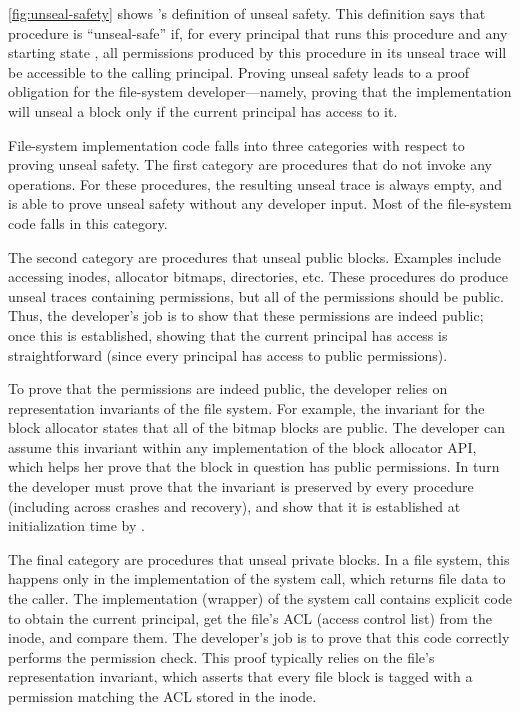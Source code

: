 \autoref{fig:unseal-safety} shows \sys's definition of unseal safety.
This definition says that procedure  is ``unseal-safe'' if,
for every principal  that runs this procedure and any starting
state , all permissions produced by this procedure in its unseal trace
 will be accessible to the calling principal.
Proving unseal safety leads to a proof obligation for the file-system
developer---namely, proving that the implementation will unseal a block
only if the current principal has access to it.

File-system implementation code falls into three categories with respect
to proving unseal safety.  The first category are procedures that do not
invoke any  operations.  For these procedures, the resulting
unseal trace is always empty, and \sys is able to prove unseal safety without
any developer input.  Most of the file-system code falls in this category.

The second category are procedures that unseal public blocks.
Examples include accessing inodes, allocator bitmaps, directories, etc.
These procedures do produce unseal traces containing permissions, but all
of the permissions should be public.  Thus, the developer's job is to
show that these permissions are indeed public; once this is established,
showing that the current principal has access is straightforward (since
every principal has access to public permissions).

To prove that the permissions are indeed public, the developer
relies on representation invariants of the file system.  For example, the
invariant for the block allocator states that all of the bitmap blocks
are public. The developer can assume this invariant within any implementation of
the block allocator API, which helps her prove that the block in question has
public permissions. In turn the developer must prove that the invariant is
preserved by every procedure (including across crashes and recovery), and show
that it is established at initialization time by .

The final category are procedures that unseal private blocks.  In a
file system, this happens only in the implementation of the 
system call, which returns file data to the caller.  The implementation (wrapper)
of the  system call contains explicit code to obtain the current
principal, get the file's ACL (access control list) from the inode, and
compare them.  The developer's job is to prove that this code correctly
performs the permission check.  This proof typically relies on the
file's representation invariant, which asserts that every file block
is tagged with a permission matching the ACL stored in the inode.

